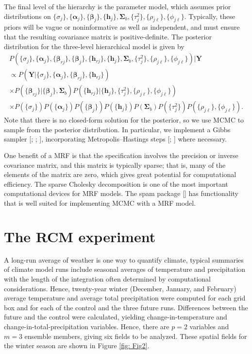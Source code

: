 \documentclass[12pt]{amsart}
\begin{document}
The final level of the hierarchy is the parameter model, which assumes prior distributions on $\{\sigma_j \}, \{\boldsymbol{\alpha}_j \}, \{\boldsymbol{\beta}_j \}, \{\boldsymbol{h}_j\}, \boldsymbol{\Sigma}_b, \{\tau_j^2\}, \{\rho_{j\ell}\}, \{\phi_{j\ell}\}$. Typically, these priors will be vague or noninformative as well as independent, and must ensure that the resulting covariance matrix is positive-definite. The posterior distribution for the three-level hierarchical model is given by
\begin{eqnarray*}
    P(\{\sigma_j \}, \{\boldsymbol{\alpha}_j \}, \{\boldsymbol{\beta}_{rj} \}, \{\boldsymbol{\beta}_{j} \} ,  \{\boldsymbol{h}_{rj}\}, \{\boldsymbol{h}_{j}\}, \boldsymbol{\Sigma}_b, \{\tau_j^2\}, \{\rho_{j\ell}\}, \{\phi_{j\ell}\}) | \boldsymbol{Y} \\
    \propto P(\boldsymbol{Y} | \{\sigma_j \}, \{\boldsymbol{\alpha}_j \}, \{\boldsymbol{\beta}_{rj} \}, \{\boldsymbol{h}_{rj}\}) \\
    \times P(\{\boldsymbol{\beta}_{rj}\} |  \{\boldsymbol{\beta}_j \}, \boldsymbol{\Sigma}_b) P(\{\boldsymbol{h}_{rj}\} | \{\boldsymbol{h}_j \}, \{\tau^2_j \}, \{\rho_{j\ell} \}, \{\phi_{j\ell}\}) \\
    \times P(\{\sigma_j \})P(\{\boldsymbol{\alpha}_j \})P(\{\boldsymbol{\beta}_j \}) P(\{\boldsymbol{h}_j\}) P(\boldsymbol{\Sigma}_b) P(\{\tau_j^2\}) P(\{\rho_{j\ell}\}, \{\phi_{j\ell}\}).
\end{eqnarray*}
Note that there is no closed-form solution for the posterior, so we use MCMC to sample from the posterior distribution. In particular, we implement a Gibbs sampler [\cite{german}; \cite{gelfand}; \cite{gelfand2}], incorporating Metropolis–Hastings steps [\cite{metropolis}; \cite{hastings}] where necessary.

One benefit of a MRF is that the specification involves the precision or inverse covariance matrix, and this matrix is typically sparse; that is, many of the elements of the matrix are zero, which gives great potential for computational efficiency. The sparse Cholesky decomposition is one of the most important computational devices for MRF models. The spam package [\cite{furrer}] has functionality that is well suited for implementing MCMC with a MRF model.

\section{The RCM experiment}

A long-run average of weather is one way to quantify climate, typical summaries of climate model runs include seasonal averages of temperature and precipitation with the length of the integration often determined by computational considerations. Hence, twenty-year winter (December, January, and February) average temperature and average total precipitation were computed for each grid box and for each of the control and the three future runs. Differences between the future and the control were calculated, yielding change-in-temperature and change-in-total-precipitation variables. Hence, there are $p = 2$ variables and $m = 3$ ensemble members, giving six fields to be analyzed. These spatial fields for the winter season are shown in Figure \ref{fig: Fig2}. 
\end{document}
